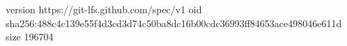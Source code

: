 version https://git-lfs.github.com/spec/v1
oid sha256:488c4c139e55f4d3cd3d74c50ba8dc16b00cdc36993ff84653ace498046e611d
size 196704
